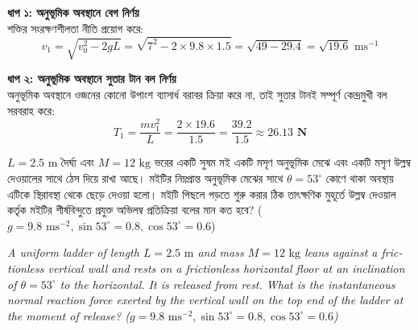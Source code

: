 \documentclass[12pt, a4paper]{article}
\begin{document}
{%
\begin{tcolorbox}[solutionbox={সমাধান (Solution)}]
\noindent
\textbf{ধাপ ১: অনুভূমিক অবস্থানে বেগ নির্ণয়} \\
শক্তির সংরক্ষণশীলতা নীতি প্রয়োগ করে:
\[v_1 = \sqrt{v_0^2 - 2gL} = \sqrt{7^2 - 2 \times 9.8 \times 1.5} = \sqrt{49 - 29.4} = \sqrt{19.6}\text{ ms}^{-1}\]

\vspace{0.5em}
\noindent\textbf{ধাপ ২: অনুভূমিক অবস্থানে সুতার টান বল নির্ণয়} \\
অনুভূমিক অবস্থানে ওজনের কোনো উপাংশ ব্যাসার্ধ বরাবর ক্রিয়া করে না, তাই সুতার টানই সম্পূর্ণ কেন্দ্রমুখী বল সরবরাহ করে:
\[T_1 = \frac{m v_1^2}{L} = \frac{2 \times 19.6}{1.5} = \frac{39.2}{1.5} \approx \mathbf{26.13\text{ N}}\]
\end{tcolorbox}
\begin{tcolorbox}[questionbox={প্রশ্ন (Question) 36}]
\noindent
$L = 2.5\text{ m}$ দৈর্ঘ্য এবং $M = 12\text{ kg}$ ভরের একটি সুষম মই একটি মসৃণ অনুভূমিক মেঝে এবং একটি মসৃণ উল্লম্ব দেওয়ালের সাথে ঠেস দিয়ে রাখা আছে। মইটির নিম্নপ্রান্ত অনুভূমিক মেঝের সাথে $\theta = 53^\circ$ কোণে থাকা অবস্থায় এটিকে স্থিরাবস্থা থেকে ছেড়ে দেওয়া হলো। মইটি পিছলে পড়তে শুরু করার ঠিক তাৎক্ষণিক মুহূর্তে উল্লম্ব দেওয়াল কর্তৃক মইটির শীর্ষবিন্দুতে প্রযুক্ত অভিলম্ব প্রতিক্রিয়া বলের মান কত হবে? ($g = 9.8\text{ ms}^{-2}, \sin 53^\circ = 0.8, \cos 53^\circ = 0.6$)

\vspace{0.8em}
\begin{english}
\noindent\textit{\color{darkgray}
A uniform ladder of length $L = 2.5\text{ m}$ and mass $M = 12\text{ kg}$ leans against a frictionless vertical wall and rests on a frictionless horizontal floor at an inclination of $\theta = 53^\circ$ to the horizontal. It is released from rest. What is the instantaneous normal reaction force exerted by the vertical wall on the top end of the ladder at the moment of release? ($g = 9.8\text{ ms}^{-2}, \sin 53^\circ = 0.8, \cos 53^\circ = 0.6$)
}
\end{english}
\end{tcolorbox}

\vspace{1em}
\begin{center}
\end{center}}
\end{document}
